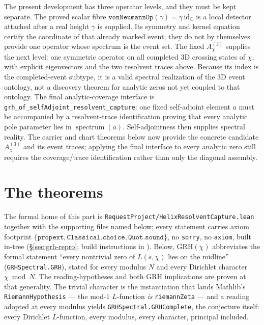 \documentclass[11pt]{article}
\theoremstyle{definition}
\begin{document}
The present development has three operator levels, and they must be kept
separate.  The proved scalar fibre
\(\texttt{vonNeumannOp}(\gamma)=\gamma\,\mathrm{id}_{\mathbb C}\) is a local
detector attached after a real height \(\gamma\) is supplied.  Its symmetry
and kernel equation certify the coordinate of that already marked event;
they do not by themselves provide one operator whose spectrum is the event
set.  The fixed \(A^{(3)}_\chi\) supplies the next level: one symmetric
operator on all completed 3D crossing states of \(\chi\), with explicit
eigenvectors and the two resolvent traces above.  Because its index is the
completed-event subtype, it is a valid spectral realization of the 3D event
ontology, not a discovery theorem for analytic zeros not yet coupled to that
ontology.  The final analytic-coverage interface is
\texttt{grh\_of\_selfAdjoint\_resolvent\_capture}: one fixed self-adjoint
element \(a\) must be accompanied by a resolvent-trace identification proving
that every analytic pole parameter lies in \(\operatorname{spectrum}(a)\).
Self-adjointness then supplies spectral reality.  The carrier and chart
theorems below now provide the concrete candidate \(A^{(3)}_\chi\) and its
event traces; applying the final interface to every analytic zero still
requires the coverage/trace identification rather than only the diagonal
assembly.

\section{The theorems}\label{sec:grh-theorems}

The formal home of this part is
\texttt{RequestProject/HelixResolventCapture.lean} together with the
supporting files named below; every statement carries axiom footprint
\(\{\texttt{propext},\texttt{Classical.choice},\texttt{Quot.sound}\}\), no
\texttt{sorry}, no \texttt{axiom}, built in-tree (\S\ref{sec:grh-repro};
build instructions in \cite{UniversalCarrier}).
Below, \(\mathrm{GRH}(\chi)\) abbreviates the formal statement ``every
nontrivial zero of \(L(s,\chi)\) lies on the midline''
(\texttt{GRHSpectral.GRH}), stated for every modulus \(N\) and every
Dirichlet character \(\chi\bmod N\). The reading-hypotheses and both GRH
implications are proven at that generality. The trivial character is the
instantiation that lands Mathlib's \texttt{RiemannHypothesis} --- the
mod-\(1\) \(L\)-function \emph{is} \texttt{riemannZeta} --- and a reading
adopted at every modulus yields \texttt{GRHSpectral.GRHComplete}, the
conjecture itself: every Dirichlet \(L\)-function, every modulus, every
character, principal included.
\end{document}
